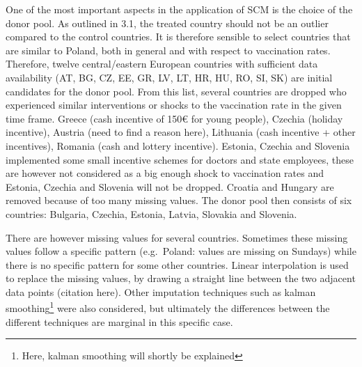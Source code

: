 \documentclass{scrbook}
\begin{document}
One of the most important aspects in the application of SCM is the
choice of the donor pool. As outlined in 3.1, the treated country should
not be an outlier compared to the control countries. It is therefore
sensible to select countries that are similar to Poland, both in general
and with respect to vaccination rates. Therefore, twelve central/eastern
European countries with sufficient data availability (AT, BG, CZ, EE,
GR, LV, LT, HR, HU, RO, SI, SK) are initial candidates for the donor
pool. From this list, several countries are dropped who experienced
similar interventions or shocks to the vaccination rate in the given
time frame. Greece (cash incentive of 150€ for young people), Czechia
(holiday incentive), Austria (need to find a reason here), Lithuania
(cash incentive + other incentives), Romania (cash and lottery
incentive). Estonia, Czechia and Slovenia implemented some small
incentive schemes for doctors and state employees, these are however not
considered as a big enough shock to vaccination rates and Estonia,
Czechia and Slovenia will not be dropped. Croatia and Hungary are
removed because of too many missing values. The donor pool then consists
of six countries: Bulgaria, Czechia, Estonia, Latvia, Slovakia and
Slovenia.

There are however missing values for several countries. Sometimes these
missing values follow a specific pattern (e.g.~Poland: values are
missing on Sundays) while there is no specific pattern for some other
countries. Linear interpolation is used to replace the missing values,
by drawing a straight line between the two adjacent data points
(citation here). Other imputation techniques such as kalman
smoothing\footnote{Here, kalman smoothing will shortly be explained}
were also considered, but ultimately the differences between the
different techniques are marginal in this specific case.
\end{document}
